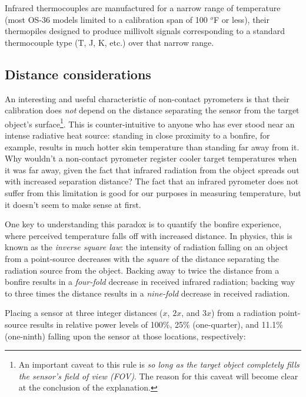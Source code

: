 Infrared thermocouples are manufactured for a narrow range of temperature (most OS-36 models limited to a calibration span of 100 $^{o}$F or less), their thermopiles designed to produce millivolt signals corresponding to a standard thermocouple type (T, J, K, etc.) over that narrow range.






\filbreak
\subsection{Distance considerations}

An interesting and useful characteristic of non-contact pyrometers is that their calibration does \textit{not} depend on the distance separating the sensor from the target object's surface\footnote{An important caveat to this rule is \textit{so long as the target object completely fills the sensor's field of view (FOV)}.  The reason for this caveat will become clear at the conclusion of the explanation.}.  This is counter-intuitive to anyone who has ever stood near an intense radiative heat source: standing in close proximity to a bonfire, for example, results in much hotter skin temperature than standing far away from it.  Why wouldn't a non-contact pyrometer register cooler target temperatures when it was far away, given the fact that infrared radiation from the object spreads out with increased separation distance?  The fact that an infrared pyrometer does not suffer from this limitation is good for our purposes in measuring temperature, but it doesn't seem to make sense at first.

One key to understanding this paradox is to quantify the bonfire experience, where perceived temperature falls off with increased distance.  In physics, this is known as the \textit{inverse square law}: the intensity of radiation falling on an object from a point-source decreases with the \textit{square} of the distance separating the radiation source from the object.  Backing away to twice the distance from a bonfire results in a \textit{four-fold} decrease in received infrared radiation; backing way to three times the distance results in a \textit{nine-fold} decrease in received radiation.   

\filbreak

Placing a sensor at three integer distances ($x$, $2x$, and $3x$) from a radiation point-source results in relative power levels of 100\%, 25\% (one-quarter), and 11.1\% (one-ninth) falling upon the sensor at those locations, respectively:

